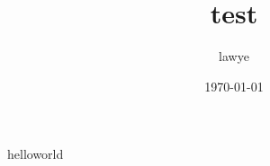 \documentclass[zihao=-4,UTF8]{ctexart}
\title{test}
\author{lawye}
\date{\today}
\begin{document}
    \maketitle
    helloworld
\end{document}
